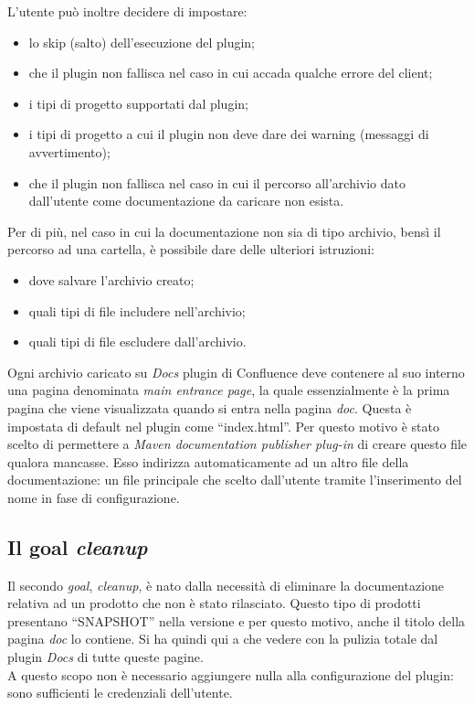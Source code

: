 
	L'utente può inoltre decidere di impostare:
	\begin{itemize}
		\item lo skip (salto) dell'esecuzione del plugin;
		\item che il plugin non fallisca nel caso in cui accada qualche errore del client;
		\item i tipi di progetto supportati dal plugin;
		\item i tipi di progetto a cui il plugin non deve dare dei warning (messaggi di avvertimento);
		\item che il plugin non fallisca nel caso in cui il percorso all'archivio dato dall'utente come documentazione da caricare non esista.
	\end{itemize}

	Per di più, nel caso in cui la documentazione non sia di tipo archivio, bensì il percorso ad una cartella, è possibile dare delle ulteriori istruzioni:
	\begin{itemize}
		\item dove salvare l'archivio creato;
		\item quali tipi di file includere nell'archivio;
		\item quali tipi di file escludere dall'archivio.
	\end{itemize}

	Ogni archivio caricato su \emph{Docs} plugin di Confluence deve contenere al suo interno una pagina denominata \emph{main entrance page}, la quale essenzialmente è la prima pagina che viene visualizzata quando si entra nella pagina \emph{doc}.
	Questa è impostata di default nel plugin come ``index.html''.
	Per questo motivo è stato scelto di permettere a \emph{Maven documentation publisher plug-in} di creare questo file qualora mancasse.
	Esso indirizza automaticamente ad un altro file della documentazione: un file principale che scelto dall'utente tramite l'inserimento del nome in fase di configurazione.


\subsection{Il goal \emph{cleanup}}
Il secondo \emph{goal}, \emph{cleanup}, è nato dalla necessità di eliminare la documentazione relativa ad un prodotto che non è stato rilasciato.
Questo tipo di prodotti presentano ``SNAPSHOT'' nella versione e per questo motivo, anche il titolo della pagina \emph{doc} lo contiene.
Si ha quindi qui a che vedere con la pulizia totale dal plugin \emph{Docs} di tutte queste pagine. \\
A questo scopo non è necessario aggiungere nulla alla configurazione del plugin: sono sufficienti le credenziali dell'utente. 

